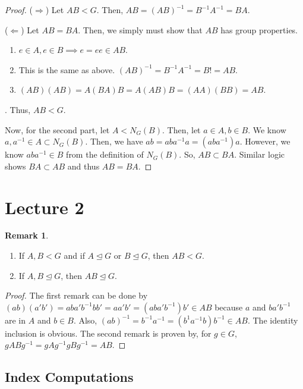 \documentclass[11pt,leqno,oneside]{amsart}
\newcommand{\subgroup}{\mathrel{<}}
\newcommand{\normsubgroup}{\mathrel{\unlhd}}
\theoremstyle{definition}
\newtheorem{rmk}[thm]{Remark}
\numberwithin{equation}{section}
\begin{document}
    \begin{proof}
        ($\Rightarrow$) Let $AB \subgroup G$. Then, $AB = (AB)^{-1} =
        B^{-1}A^{-1} = BA$.

        ($\Leftarrow$) Let $AB = BA$. Then, we simply must show that $AB$ has
        group properties.\begin{enumerate}
            \item $e \in A, e \in B \implies e = ee \in AB$.
            \item This is the same as above. $(AB)^{-1} = B^{-1}A^{-1} = B! = AB$.
            \item $(AB)(AB) = A(BA)B = A(AB)B = (AA)(BB) = AB$.
        \end{enumerate}. Thus, $AB \subgroup G$.

        Now, for the second part, let $A \subgroup N_G(B)$. Then, let $a \in A,
        b \in B$. We know $a,a^{-1} \in A \subset N_G(B)$. Then, we have $ab =
        aba^{-1}a = (aba^{-1})a$. However, we know $aba^{-1} \in B$ from the
        definition of $N_G(B)$. So, $AB \subset BA$. Similar logic shows $BA
        \subset AB$ and thus $AB = BA$.
    \end{proof}

    \section{Lecture 2}
    \begin{rmk}
        \begin{enumerate}
            \item If $A,B \subgroup G$ and if $A \normsubgroup G$ or $B \normsubgroup G$, then $AB \subgroup G$.
            \item If $A,B \normsubgroup G$, then $AB \normsubgroup G$.
        \end{enumerate}
    \end{rmk}
    \begin{proof}
        The first remark can be done by $(ab)(a'b') = aba'b^{-1}bb' = aa'b' = (aba'b^{-1})b' \in AB$ because $a$ and $ba'b^{-1}$ are in $A$ and $b \in B$. Also, $(ab)^{-1} = b^{-1}a^{-1} = (b^{1}a^{-1}b)b^{-1} \in AB$. The identity inclusion is obvious.
        The second remark is proven by, for $g \in G$, $gABg^{-1} = gAg^{-1}gBg^{-1} = AB$. 
    \end{proof}

    \subsection{Index Computations}
\end{document}
